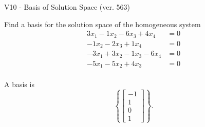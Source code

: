 \begin{exercise}
  \begin{exerciseTitle}V10 - Basis of Solution Space (ver. 563)\end{exerciseTitle}
  \begin{exerciseStatement}
    Find a basis for the solution space of the homogeneous system 
\begin{align*}
 3 x_ 1 -1 x_ 2 -6 x_ 3 + 4 x_ 4 &= 0  \\ 
  -1 x_ 2 -2 x_ 3 + 1 x_ 4 &= 0  \\ 
  -3 x_ 1 + 3 x_ 2 -1 x_ 3 -6 x_ 4 &= 0  \\ 
  -5 x_ 1 -5 x_ 2 + 4 x_ 3 &= 0  \\ 
 \end{align*}


 
  \end{exerciseStatement}

  \begin{exerciseAnswer}
   A basis is   
\[\left\{\left[\begin{array}{c}
-1 \\
1 \\
0 \\
1
\end{array}\right]\right\}.\]

  


  \end{exerciseAnswer}
\end{exercise}